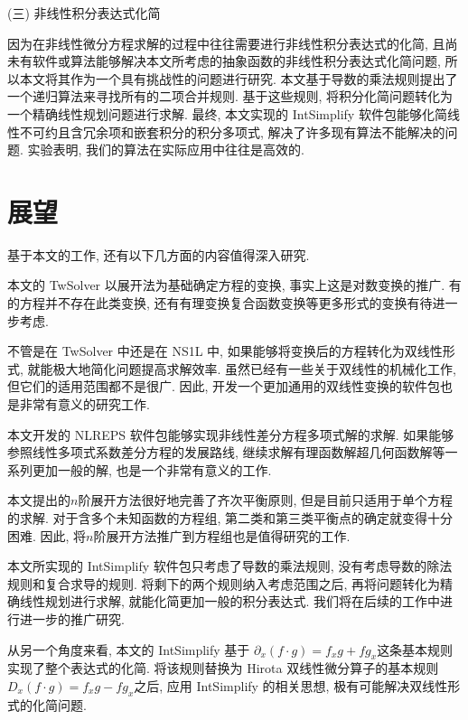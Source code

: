 (三) 非线性积分表达式化简

因为在非线性微分方程求解的过程中往往需要进行非线性积分表达式的化简, 且尚未有软件或算法能够解决本文所考虑的抽象函数的非线性积分表达式化简问题, 所以本文将其作为一个具有挑战性的问题进行研究. 本文基于导数的乘法规则提出了一个递归算法来寻找所有的二项合并规则. 基于这些规则, 将积分化简问题转化为一个精确线性规划问题进行求解. 最终, 本文实现的 IntSimplify 软件包能够化简线性不可约且含冗余项和嵌套积分的积分多项式, 解决了许多现有算法不能解决的问题. 实验表明, 我们的算法在实际应用中往往是高效的. 

\section{展望}
基于本文的工作, 还有以下几方面的内容值得深入研究.
\begin{compactenum}[(1)]
\item 本文的 TwSolver 以\Painleve{}展开法为基础确定方程的变换, 事实上这是对数变换的推广. 有的方程并不存在此类变换, 还有有理变换\D 复合函数变换等更多形式的变换有待进一步考虑.
\item 不管是在 TwSolver 中还是在 NS1L 中, 如果能够将变换后的方程转化为双线性形式, 就能极大地简化问题\D 提高求解效率. 虽然已经有一些关于双线性的机械化工作, 但它们的适用范围都不是很广. 因此, 开发一个更加通用的双线性变换的软件包也是非常有意义的研究工作.
\item 本文开发的 NLREPS 软件包能够实现非线性差分方程多项式解的求解. 如果能够参照线性多项式系数差分方程的发展路线, 继续求解有理函数解\D 超几何函数解等一系列更加一般的解, 也是一个非常有意义的工作. 
\item 本文提出的$n$阶展开方法很好地完善了齐次平衡原则, 但是目前只适用于单个方程的求解. 对于含多个未知函数的方程组, 第二类和第三类平衡点的确定就变得十分困难. 因此, 将$n$阶展开方法推广到方程组也是值得研究的工作.
\item 本文所实现的 IntSimplify 软件包只考虑了导数的乘法规则, 没有考虑导数的除法规则和复合求导的规则. 将剩下的两个规则纳入考虑范围之后, 再将问题转化为精确线性规划进行求解, 就能化简更加一般的积分表达式. 我们将在后续的工作中进行进一步的推广研究. 
\item 从另一个角度来看, 本文的 IntSimplify 基于 $\partial_x (f\cdot g)=f_xg+fg_x$这条基本规则实现了整个表达式的化简. 将该规则替换为 Hirota 双线性微分算子的基本规则$D_x(f\cdot g)=f_xg-fg_x$之后, 应用 IntSimplify 的相关思想, 极有可能解决双线性形式的化简问题.
\end{compactenum}

